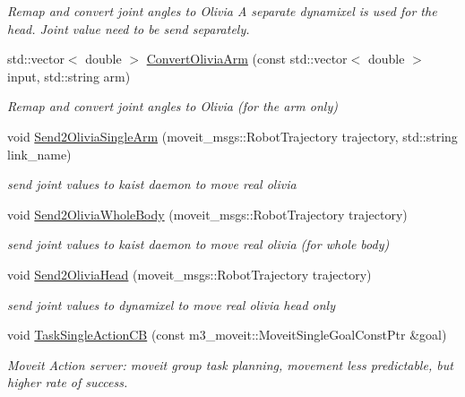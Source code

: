 \begin{DoxyCompactItemize}
\begin{DoxyCompactList}\small\item\em Remap and convert joint angles to Olivia A separate dynamixel is used for the head. Joint value need to be send separately. \end{DoxyCompactList}\item 
std\+::vector$<$ double $>$ \hyperlink{classM3MoveGroup_a422eebf405bc0b3187bb6e692b361fa0}{Convert\+Olivia\+Arm} (const std\+::vector$<$ double $>$ input, std\+::string arm)
\begin{DoxyCompactList}\small\item\em Remap and convert joint angles to Olivia (for the arm only) \end{DoxyCompactList}\item 
void \hyperlink{classM3MoveGroup_a0b0b4680d729b8878a89ba03c6d59303}{Send2\+Olivia\+Single\+Arm} (moveit\+\_\+msgs\+::\+Robot\+Trajectory trajectory, std\+::string link\+\_\+name)
\begin{DoxyCompactList}\small\item\em send joint values to kaist daemon to move real olivia \end{DoxyCompactList}\item 
void \hyperlink{classM3MoveGroup_a8adcfcf74c2e2350189be855dca572de}{Send2\+Olivia\+Whole\+Body} (moveit\+\_\+msgs\+::\+Robot\+Trajectory trajectory)
\begin{DoxyCompactList}\small\item\em send joint values to kaist daemon to move real olivia (for whole body) \end{DoxyCompactList}\item 
void \hyperlink{classM3MoveGroup_a5f4c7d0260a2d987e5abaf1b1365c657}{Send2\+Olivia\+Head} (moveit\+\_\+msgs\+::\+Robot\+Trajectory trajectory)
\begin{DoxyCompactList}\small\item\em send joint values to dynamixel to move real olivia head only \end{DoxyCompactList}\item 
void \hyperlink{classM3MoveGroup_a5cbdff90f02f8067d55c1b4592b24b72}{Task\+Single\+Action\+CB} (const m3\+\_\+moveit\+::\+Moveit\+Single\+Goal\+Const\+Ptr \&goal)
\begin{DoxyCompactList}\small\item\em Moveit Action server\+: moveit group task planning, movement less predictable, but higher rate of success. \end{DoxyCompactList}\item 

\end{DoxyCompactItemize}
